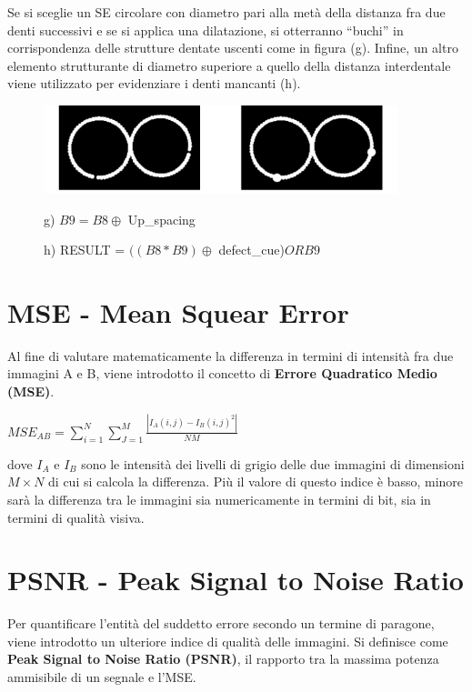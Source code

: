 Se si sceglie un SE circolare con diametro pari alla metà della distanza fra due denti successivi e se si applica una dilatazione, si
otterranno “buchi” in corrispondenza delle strutture dentate uscenti come in figura (g). Infine, un altro elemento strutturante di diametro superiore a
quello della distanza interdentale viene utilizzato per evidenziare i denti mancanti (h).

\begin{figure}[H]
    \centering
    \includegraphics[width=\linewidth, keepaspectratio]{capitoli/immagini/imgs/orologi5.png}
    \caption*{g) $B9=B8 \oplus$ Up\_spacing}
    \caption*{h) RESULT = $((B8 * B9) \oplus$ defect\_cue)$OR B9$ }
\end{figure}

\section{MSE - Mean Squear Error}
Al fine di valutare matematicamente la differenza in termini di intensità fra due immagini A e B, viene introdotto il concetto di
\textbf{Errore Quadratico Medio (MSE)}.

\begin{center}
    $MSE_{AB} = \sum_{i=1}^{N}\sum_{J=1}^{M}\frac{|I_A(i,j)-I_B(i,j)^2|}{NM}$
\end{center}

dove $I_A$ e $I_B$ sono le intensità dei livelli di grigio delle due immagini di dimensioni $M × N$ di cui si calcola la differenza. Più il valore di questo indice è basso, minore sarà la differenza tra
le immagini sia numericamente in termini di bit, sia in termini di qualità visiva.

\section{PSNR - Peak Signal to Noise Ratio}
Per quantificare l'entità del suddetto errore secondo un termine di paragone, viene introdotto un ulteriore indice di qualità delle
immagini. Si definisce come \textbf{Peak Signal to Noise Ratio (PSNR)}, il rapporto
tra la massima potenza ammisibile di un segnale e l'MSE.

